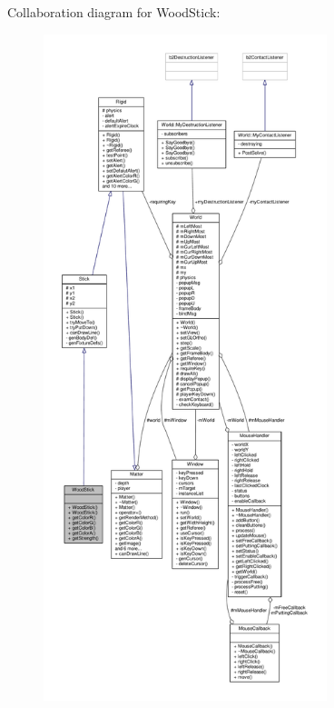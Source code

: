 Collaboration diagram for Wood\+Stick\+:
\nopagebreak
\begin{figure}[H]
\begin{center}
\leavevmode
\includegraphics[height=550pt]{classWoodStick__coll__graph}
\end{center}
\end{figure}
